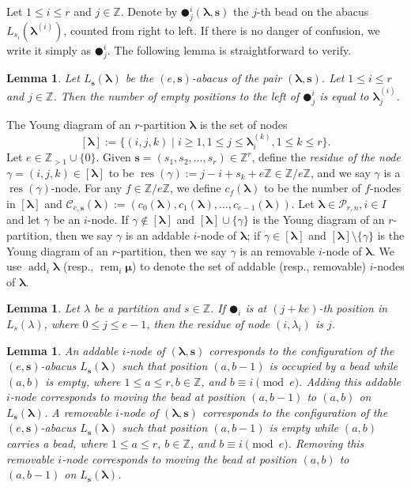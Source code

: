 \documentclass[a4paper,10pt]{amsart}
\theoremstyle{plain}
\newcommand{\lam}{\lambda}
\def\bs{{\boldsymbol{s}}}
\def\Z{{\mathbb Z}}
\def\PP{\mathscr{P}}
\def\blam{{\boldsymbol \lambda}}
\def\bmu{{\boldsymbol \mu}}
\DeclareMathOperator{\res}{res}
\newcommand{\add}{\operatorname{add}}
\newcommand{\rem}{\operatorname{rem}}
\theoremstyle{plain}
\newtheorem{lemma}[theorem]{Lemma}
\numberwithin{equation}{section}
\begin{document}
Let $1\leq i\leq r$ and $j\in\Z$. Denote by $\CIRCLE_j^i(\blam, \bs)$ the $j$-th bead on the abacus $L_{s_i}(\blam^{(i)})$, counted from right to left. If there is no danger of confusion, we write it simply as $\CIRCLE_j^i$.
The following lemma is straightforward to verify.

\begin{lemma}\label{bead minus}
Let $L_\bs(\blam)$ be the $(e,\bs)$-abacus of the pair $(\blam, \bs)$. Let $1\leq i\leq r$ and $j\in\Z$. Then the number of empty positions to the left of $\CIRCLE_j^i$ is equal to $\blam^{(i)}_j$.
\end{lemma}



The Young diagram of an $r$-partition $\blam$ is the set of nodes $$[\blam]:=\{(i, j, k)\mid i\geq 1, 1\leq j\leq\blam^{(k)}_i, 1\leq k\leq r\}.$$
Let $e\in\Z_{>1}\cup\{0\}$. Given $\bs=(s_1, s_2, \dots, s_r)\in \Z^r$, define the {\em residue of the node} $\gamma=(i, j, k)\in [\blam]$ to be $\res(\gamma):={j-i+s_k}+e\Z\in\Z/e\Z$, and we say $\gamma$ is a $\res(\gamma)$-node. For any $f\in\Z/e\Z$, we define
$c_f(\blam)$ to be the number of $f$-nodes in $[\blam]$ and $\mathcal{C}_{e, \bs}(\blam):=(c_0(\blam), c_1(\blam), \dots, c_{{e-1}}(\blam))$.
Let $\blam\in\PP_{r,n}, i\in I$ and let $\gamma$ be an $i$-node. If $\gamma\notin [\blam]$ and $[\blam]\cup\{\gamma\}$ is the Young diagram of an $r$-partition, then we say $\gamma$ is an addable $i$-node of $\blam$; if $\gamma\in [\blam]$ and $[\blam]\setminus\{\gamma\}$ is the Young diagram of an $r$-partition, then we say $\gamma$ is an removable $i$-node of $\blam$. We use $\add_i\blam$ (resp., $\rem_i\bmu$) to denote the set of addable (resp., removable) $i$-nodes of $\blam$.

\begin{lemma}\label{3.2.2}
Let $\lambda$ be a partition and $s\in\Z$. If $\CIRCLE_i$ is at $(j+ke)$-th position in $L_s(\lam)$, where $0\le j\le e-1$,
then the residue of node $(i, \lam_i)$ is $j$.
\end{lemma}

\begin{lemma}\label{add and rem}
An addable $i$-node of $(\boldsymbol{\lambda},\boldsymbol{s})$ corresponds to the configuration of the $(e,\bs)$-abacus $L_{\boldsymbol{s}}(\boldsymbol{\lambda})$ such that position $(a,b-1)$ is occupied by a bead while $(a,b)$ is empty, where $1\le a\le r, b\in\Z$, and $b\equiv i\pmod{e}$. Adding this addable $i$-node corresponds to moving the bead at position \((a,b-1)\) to \((a,b)\) on \(L_{\boldsymbol{s}}(\boldsymbol{\lambda})\). A removable $i$-node of \((\boldsymbol{\lambda},\bs)\) corresponds to the configuration of the $(e,\bs)$-abacus \(L_{\boldsymbol{s}}(\boldsymbol{\lambda})\) such that position \((a,b-1)\) is empty while \((a,b)\) carries a bead, where \(1\le a\le r\), \(b\in\mathbb{Z}\), and \(b\equiv i\pmod{e}\). Removing this removable $i$-node corresponds to moving the bead at position \((a,b)\) to \((a,b-1)\) on \(L_{\boldsymbol{s}}(\boldsymbol{\lambda})\).
\end{lemma}
\end{document}
